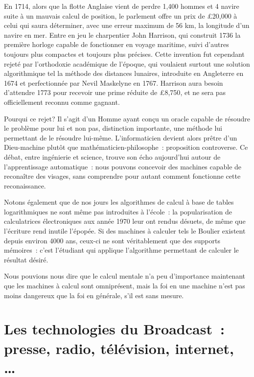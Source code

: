 En 1714, alors que la flotte Anglaise vient de perdre 1,400 hommes et 4 navire suite à un mauvais calcul de position, le parlement offre un prix de \pounds{20,000} à celui qui saura déterminer, avec une erreur maximum de 56 km, la longitude d'un navire en mer\cite{longitude}. Entre en jeu le charpentier John Harrison, qui construit 1736 la première horloge capable de fonctionner en voyage maritime, suivi d'autres toujours plus compactes et toujours plus précises. Cette invention fut cependant rejeté par l'orthodoxie académique de l'époque, qui voulaient surtout une solution algorithmique tel la méthode des distances lunaires, introduite en Angleterre en 1674 et perfectionnée par Nevil Maskelyne en 1767\cite{history-longitude}. Harrison aura besoin d'attendre 1773 pour recevoir une prime réduite de \pounds{8,750}, et ne sera pas officiellement reconnu comme gagnant.

Pourqui ce rejet? Il s'agit d'un Homme ayant conçu un \og{}oracle\fg{} capable de résoudre le problème pour lui et non pas, distinction importante, une méthode lui permettant de le résoudre lui-même. L'informaticien devient alors prêtre d'un Dieu-machine plutôt que mathématicien-philosophe~: proposition controverse. Ce débat, entre ingénierie et science, trouve son écho aujourd'hui autour de l'apprentissage automatique~: nous pouvons concevoir des machines capable de reconaître des visages, sans comprendre pour autant comment fonctionne cette reconaissance. 

Notons également que de nos jours les algorithmes de calcul à base de tables logarithmiques ne sont même pas introduites à l'école~: la popularisation de calculatrices électroniques aux année 1970 leur ont rendus désuets, de même que l'écriture rend inutile l'épopée. Si des machines à calculer tels le Boulier existent depuis environ 4000 ans, ceux-ci ne sont véritablement que des supports mémoires~: c'est l'étudiant qui applique l'algorithme permettant de calculer le résultat désiré. 

Nous pouvions nous dire que le calcul mentale n'a peu d'importance maintenant que les machines à calcul sont omniprésent, mais la foi en une machine n'est pas moins dangereux que la foi en générale, s'il est sans mesure. 


\section{Les technologies du \og{}Broadcast\fg{}~: presse, radio, télévision, internet, \ldots}


